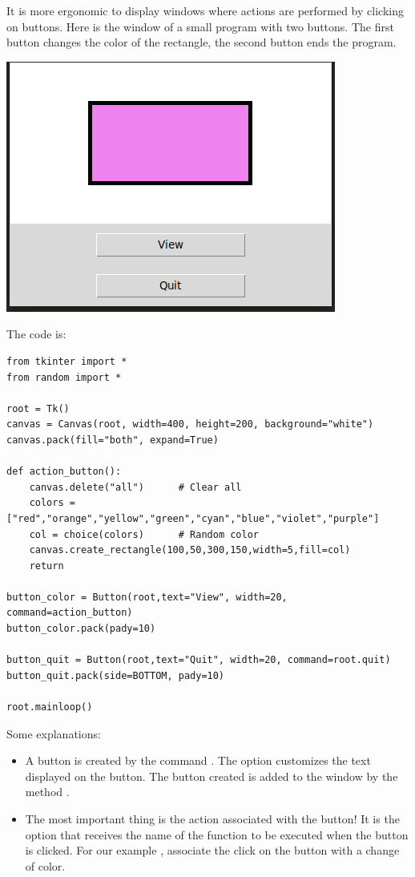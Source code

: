 \documentclass[11pt,class=report,crop=false]{standalone}
\begin{document}
\begin{cours}


It is more ergonomic to display windows where actions are performed by clicking on buttons.
Here is the window of a small program with two buttons. The first button changes the color of the rectangle, the second button ends the program.
\begin{center}
\includegraphics[scale=\myscale,scale=0.6]{screen-stat-lesson-buttons-en}
\end{center}

The code is:
\begin{lstlisting}
from tkinter import *
from random import *

root = Tk()     
canvas = Canvas(root, width=400, height=200, background="white")
canvas.pack(fill="both", expand=True)

def action_button():
    canvas.delete("all")      # Clear all
    colors = ["red","orange","yellow","green","cyan","blue","violet","purple"]
    col = choice(colors)      # Random color
    canvas.create_rectangle(100,50,300,150,width=5,fill=col)
    return

button_color = Button(root,text="View", width=20, command=action_button)
button_color.pack(pady=10)

button_quit = Button(root,text="Quit", width=20, command=root.quit)
button_quit.pack(side=BOTTOM, pady=10)

root.mainloop()
\end{lstlisting}

Some explanations:
\begin{itemize}
  \item A button is created by the command . The  option customizes the text displayed on the button. The button created is added to the window by the method .
  \item The most important thing is the action associated with the button! It is the option  that receives the name of the function to be executed when the button is clicked. For our example , associate the click on the button with a change of color.
  

\end{itemize}
\end{cours}
\end{document}
